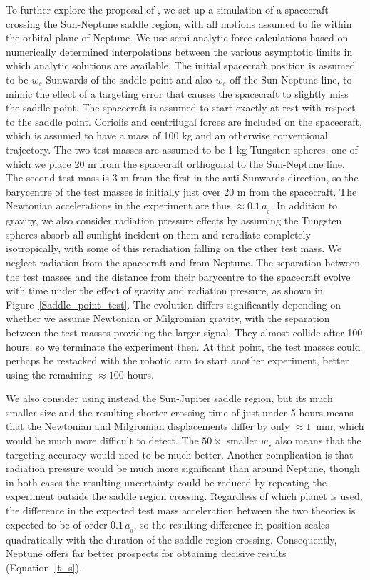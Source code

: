 \documentclass[fleqn,usenatbib,useAMS,onecolumn]{mnras} %
\begin{document}
To further explore the proposal of \citet{Penner_2020}, we set up a simulation of a spacecraft crossing the Sun-Neptune saddle region, with all motions assumed to lie within the orbital plane of Neptune. We use semi-analytic force calculations based on numerically determined interpolations between the various asymptotic limits in which analytic solutions are available. The initial spacecraft position is assumed to be $w_s$ Sunwards of the saddle point and also $w_s$ off the Sun-Neptune line, to mimic the effect of a targeting error that causes the spacecraft to slightly miss the saddle point. The spacecraft is assumed to start exactly at rest with respect to the saddle point. Coriolis and centrifugal forces are included on the spacecraft, which is assumed to have a mass of 100 kg and an otherwise conventional trajectory. The two test masses are assumed to be 1 kg Tungsten spheres, one of which we place 20 m from the spacecraft orthogonal to the Sun-Neptune line. The second test mass is 3 m from the first in the anti-Sunwards direction, so the barycentre of the test masses is initially just over 20 m from the spacecraft. The Newtonian accelerations in the experiment are thus $\approx 0.1 \, a_{_0}$. In addition to gravity, we also consider radiation pressure effects by assuming the Tungsten spheres absorb all sunlight incident on them and reradiate completely isotropically, with some of this reradiation falling on the other test mass. We neglect radiation from the spacecraft and from Neptune. The separation between the test masses and the distance from their barycentre to the spacecraft evolve with time under the effect of gravity and radiation pressure, as shown in Figure~\ref{Saddle_point_test}. The evolution differs significantly depending on whether we assume Newtonian or Milgromian gravity, with the separation between the test masses providing the larger signal. They almost collide after 100 hours, so we terminate the experiment then. At that point, the test masses could perhaps be restacked with the robotic arm to start another experiment, better using the remaining $\approx 100$ hours.

We also consider using instead the Sun-Jupiter saddle region, but its much smaller size and the resulting shorter crossing time of just under 5 hours means that the Newtonian and Milgromian displacements differ by only $\approx 1$~mm, which would be much more difficult to detect. The $50\times$ smaller $w_s$ also means that the targeting accuracy would need to be much better. Another complication is that radiation pressure would be much more significant than around Neptune, though in both cases the resulting uncertainty could be reduced by repeating the experiment outside the saddle region crossing. Regardless of which planet is used, the difference in the expected test mass acceleration between the two theories is expected to be of order $0.1\,a_{_0}$, so the resulting difference in position scales quadratically with the duration of the saddle region crossing. Consequently, Neptune offers far better prospects for obtaining decisive results (Equation~\ref{t_s}).
\end{document}
